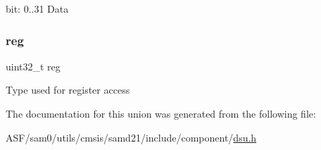 bit\+: 0..31 Data \mbox{\label{union_d_s_u___d_a_t_a___type_a6b91636401516a477989a336376d7b40}} 
\subsubsection{\texorpdfstring{reg}{reg}}
{\footnotesize\ttfamily uint32\+\_\+t reg}

Type used for register access 

The documentation for this union was generated from the following file\+:\begin{DoxyCompactItemize}
\item 
A\+S\+F/sam0/utils/cmsis/samd21/include/component/\mbox{\hyperlink{component_2dsu_8h}{dsu.\+h}}\end{DoxyCompactItemize}
